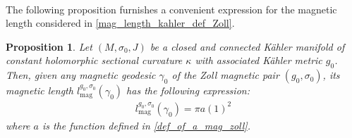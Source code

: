 \documentclass[11pt]{amsart}
\theoremstyle{plain}
\newtheorem{proposition}[theorem]{Proposition}
\theoremstyle{definition}
\theoremstyle{remark}
\begin{document}
\\
The following proposition furnishes a convenient expression for the magnetic length considered in \eqref{mag_length_kahler_def_Zoll}.
\begin{proposition}\label{action_of_fubini_study_mag_system}
Let $(M,\sigma_0,J)$ be a closed and connected K\"ahler manifold of constant holomorphic sectional curvature $\kappa$ with associated K\"ahler metric $g_0$. Then, given any magnetic geodesic $\gamma_0$ of the Zoll magnetic pair $(g_0,\sigma_0)$, its magnetic length $l^{g_0,\sigma_0}_{\text{mag}}(\gamma_0)$ has the following expression:
\begin{align}
   l^{g_0,\sigma_0}_{\text{mag}}(\gamma_{0}) =  \pi a(1)^2
    \end{align}
    where $a$ is the function defined in
\eqref{def_of_a_mag_zoll}. 
\end{proposition}
\end{document}

